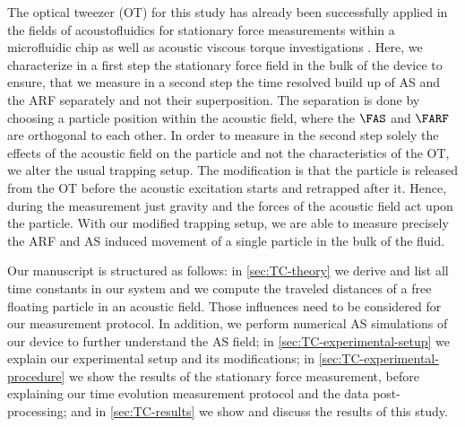 The optical tweezer (OT) for this study has already been successfully applied 
in the fields of acoustofluidics for stationary force measurements within a 
microfluidic chip \cite{Lamprecht2016,Lakaemper2015} as well as acoustic 
viscous torque investigations \cite{Lamprecht2021}. Here, we characterize in a 
first step the stationary force field in the bulk of the device to ensure, that 
we measure in a second step the time resolved build up of AS and the ARF 
separately and not their superposition. The separation is done by choosing a 
particle position within the acoustic field, where the $\FAS$ and $\FARF$ are 
orthogonal to each other. In order to measure in the second step solely the 
effects of the acoustic field on the particle and not the characteristics of 
the OT, we alter the usual trapping setup. The modification is that the 
particle is released from the OT before the acoustic excitation starts and 
retrapped after it.  Hence, during the measurement just gravity and the forces 
of the acoustic field act upon the particle. With our modified trapping setup, 
we are able to measure precisely the ARF and AS induced movement of a single 
particle in the bulk of the fluid.

Our manuscript is structured as follows: in \cref{sec:TC-theory} we derive and 
list all time constants in our system and we compute the traveled distances of 
a free floating particle in an acoustic field. Those influences need to be 
considered for our measurement protocol. In addition, we perform numerical AS 
simulations of our device to further understand the AS field; in 
\cref{sec:TC-experimental-setup} we explain our experimental setup and its 
modifications; in \cref{sec:TC-experimental-procedure} we show the results of the 
stationary force measurement, before explaining our time evolution measurement 
protocol and the data post-processing; and in \cref{sec:TC-results} we show and 
discuss the results of this study.



